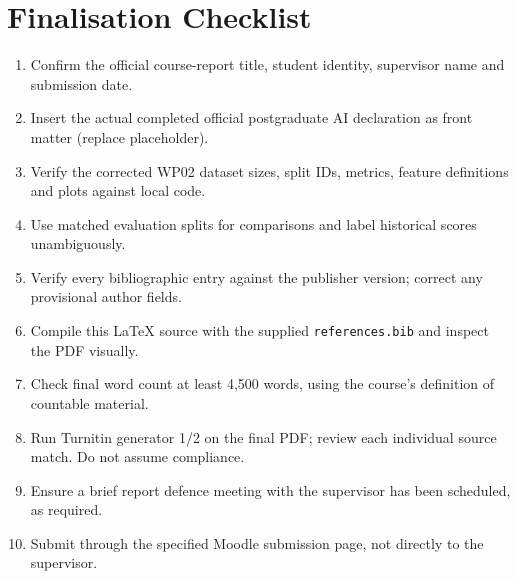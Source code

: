 \documentclass[12pt,a4paper,oneside]{report}
\begin{document}
\chapter{Finalisation Checklist}
\begin{enumerate}
\item Confirm the official course-report title, student identity, supervisor name and submission date.
\item Insert the actual completed official postgraduate AI declaration as front matter (replace placeholder).
\item Verify the corrected WP02 dataset sizes, split IDs, metrics, feature definitions and plots against local code.
\item Use matched evaluation splits for comparisons and label historical scores unambiguously.
\item Verify every bibliographic entry against the publisher version; correct any provisional author fields.
\item Compile this LaTeX source with the supplied \texttt{references.bib} and inspect the PDF visually.
\item Check final word count at least 4,500 words, using the course's definition of countable material.
\item Run Turnitin generator 1/2 on the final PDF; review each individual source match. Do not assume compliance.
\item Ensure a brief report defence meeting with the supervisor has been scheduled, as required.
\item Submit through the specified Moodle submission page, not directly to the supervisor.
\end{enumerate}
\end{document}
